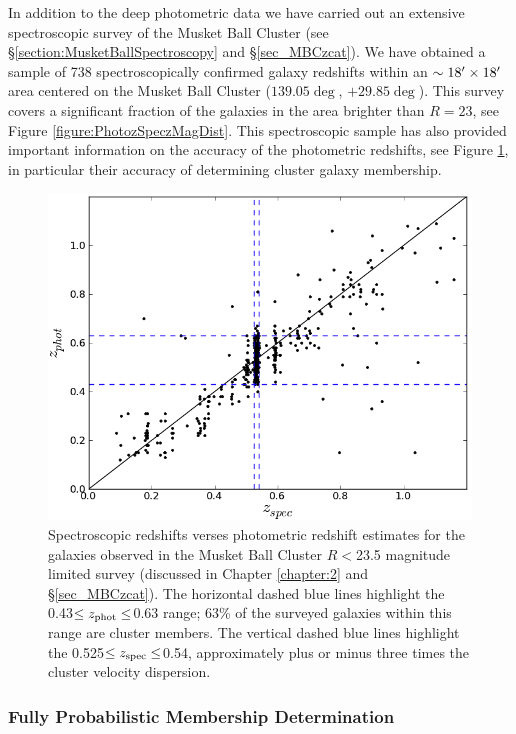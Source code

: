 In addition to the deep photometric data we have carried out an extensive spectroscopic survey of the Musket Ball Cluster (see \S\ref{section:MusketBallSpectroscopy} and \S\ref{sec_MBCzcat}).
We have obtained a sample of 738 spectroscopically confirmed galaxy redshifts within an $\sim 18\mbox{$^\prime$} \times 18\mbox{$^\prime$}$ area centered on the Musket Ball Cluster ($139.05\deg$, $+29.85\deg$).
This survey covers a significant fraction of the galaxies in the area brighter than $R=23$, see Figure \ref{figure:PhotozSpeczMagDist}.
This spectroscopic sample has also provided important information on the accuracy of the photometric redshifts, see Figure \ref{figure:photzVSspecz}, in particular their accuracy of determining cluster galaxy membership.

\begin{figure}
\centering
\includegraphics[width=5in]{Chapter4/photVSspec.png}
\caption[Spectroscopic verses photometric redshift for the Musket Ball Cluster.]{
Spectroscopic redshifts verses photometric redshift estimates for the galaxies observed in the Musket Ball Cluster $R<$23.5 magnitude limited survey (discussed in Chapter \ref{chapter:2} and \S\ref{sec_MBCzcat}).
The horizontal dashed blue lines highlight the 0.43$\leq z_{\rm phot} \leq$0.63 range;
63\% of the surveyed galaxies within this range are cluster members.
The vertical dashed blue lines highlight the 0.525$\leq z_{\rm spec} \leq$0.54, approximately plus or minus three times the cluster velocity dispersion.
}
\label{figure:photzVSspecz}
\end{figure}


\subsubsection{Fully Probabilistic Membership Determination}

